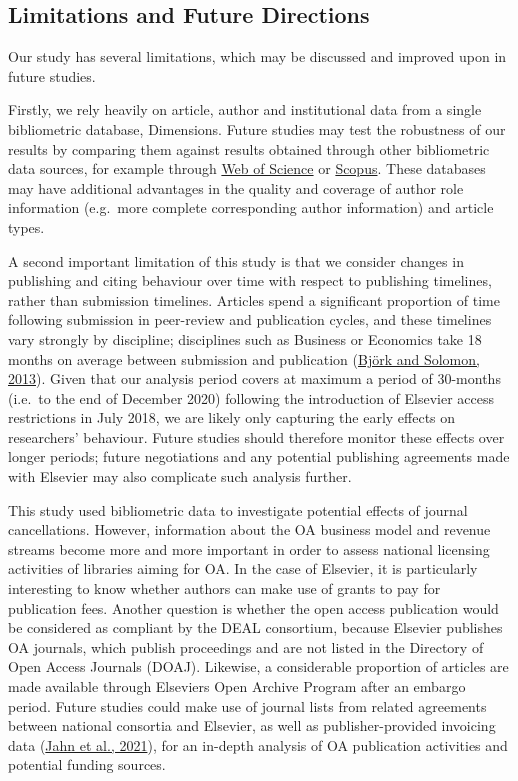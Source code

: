 \documentclass[
]{article}
\begin{document}
\hypertarget{limitations-and-future-directions}{%
\subsection{Limitations and Future Directions}\label{limitations-and-future-directions}}

Our study has several limitations, which may be discussed and improved upon in future studies.

Firstly, we rely heavily on article, author and institutional data from a single bibliometric database, Dimensions. Future studies may test the robustness of our results by comparing them against results obtained through other bibliometric data sources, for example through \href{https://www.webofknowledge.com/}{Web of Science} or \href{https://www.scopus.com}{Scopus}. These databases may have additional advantages in the quality and coverage of author role information (e.g.~more complete corresponding author information) and article types.

A second important limitation of this study is that we consider changes in publishing and citing behaviour over time with respect to publishing timelines, rather than submission timelines. Articles spend a significant proportion of time following submission in peer-review and publication cycles, and these timelines vary strongly by discipline; disciplines such as Business or Economics take 18 months on average between submission and publication (\href{https://doi.org/10.1016/j.joi.2013.09.001}{Björk and Solomon, 2013}). Given that our analysis period covers at maximum a period of 30-months (i.e.~to the end of December 2020) following the introduction of Elsevier access restrictions in July 2018, we are likely only capturing the early effects on researchers' behaviour. Future studies should therefore monitor these effects over longer periods; future negotiations and any potential publishing agreements made with Elsevier may also complicate such analysis further.

This study used bibliometric data to investigate potential effects of journal cancellations. However, information about the OA business model and revenue streams become more and more important in order to assess national licensing activities of libraries aiming for OA. In the case of Elsevier, it is particularly interesting to know whether authors can make use of grants to pay for publication fees. Another question is whether the open access publication would be considered as compliant by the DEAL consortium, because Elsevier publishes OA journals, which publish proceedings and are not listed in the Directory of Open Access Journals (DOAJ). Likewise, a considerable proportion of articles are made available through Elsevier\textquotesingle s Open Archive Program after an embargo period. Future studies could make use of journal lists from related agreements between national consortia and Elsevier, as well as publisher-provided invoicing data (\href{http://arxiv.org/abs/2102.04789\%7D}{Jahn et al., 2021}), for an in-depth analysis of OA publication activities and potential funding sources.
\end{document}
